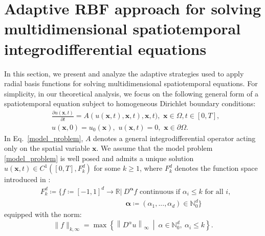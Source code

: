 \section{Adaptive RBF approach for solving multidimensional spatiotemporal integrodifferential equations}
\label{section2}
In this section, we present and analyze the adaptive strategies used to apply radial basis functions for solving multidimensional spatiotemporal equations. For simplicity, in our theoretical analysis, we focus on the following general form of a spatiotemporal equation subject to homogeneous Dirichlet boundary conditions:
\begin{equation}
\begin{aligned}
    &\frac{\partial u(\bm{x}, t)}{\partial t} = A(u(\bm{x}, t), \bm{x}, t), \bm{x}, t), \,\,\bm{x}\in\Omega, t\in[0, T],\\
    & u(\bm{x}, 0) = u_0(\bm{x}), \,\, u(\bm{x}, t) = 0, \,\,\bm{x}\in\partial\Omega.
    \end{aligned}
    \label{model_problem}
\end{equation}
In Eq.~\eqref{model_problem}, $A$ denotes a general integrodifferential operator acting only on the spatial variable $\bm{x}$. We assume that the model problem \eqref{model_problem} is well posed and admits a unique solution $u(\bm{x},t)\in C^1([0,T],F_k^d)$ for some $k\ge 1$, where $F_k^d$ denotes the function space introduced in \cite{barthelmann2000high}:
\begin{equation}
\begin{aligned}
&F_k^d \coloneqq  \Big\{ f \coloneqq [-1, 1]^d \to \mathbb{R}  \big|\ D^{\bm{\alpha}}f \text{ continuous if } \alpha_i \leq k \text{ for all } i,\\
&\hspace{5cm}\bm{\alpha}\coloneqq(\alpha_1,...,\alpha_d)\in \mathbb{N}_0^d \Big\}
\end{aligned}
\end{equation}
equipped with the norm:
\begin{equation}
\|f\|_{k, \infty} = \max\left\{ \left\|D^{\alpha}u\right\|_{\infty} \ \middle|\ \alpha \in \mathbb{N}_0^d,\ \alpha_i \leq k \right\}.
\end{equation}


